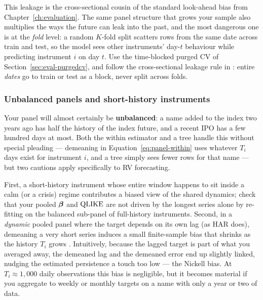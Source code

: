 \begin{projectconnection}
This leakage is the cross-sectional cousin of the standard look-ahead bias from
Chapter~\ref{ch:evaluation}.  The same panel structure that grows your sample
also multiplies the ways the future can leak into the past, and the most
dangerous one is at the \emph{fold} level: a random $K$-fold split scatters rows
from the same date across train and test, so the model sees other instruments'
day-$t$ behaviour while predicting instrument $i$ on day $t$.  Use the
time-blocked purged CV of Section~\ref{sec:eval-purgedcv}, and follow the
cross-sectional leakage rule in : entire
\emph{dates} go to train or test as a block, never split across folds.
\end{projectconnection}

\subsubsection*{Unbalanced panels and short-history instruments}

Your panel will almost certainly be \textbf{unbalanced}: a name added to the
index two years ago has half the history of the index future, and a recent IPO
has a few hundred days at most.  Both the within estimator and a tree handle this
without special pleading --- demeaning in Equation~\eqref{eq:panel-within} uses
whatever $T_i$ days exist for instrument $i$, and a tree simply sees fewer rows
for that name --- but two cautions apply specifically to RV forecasting.

\begin{warning}
First, a short-history instrument whose entire window happens to sit inside a
calm (or a crisis) regime contributes a biased view of the shared dynamics;
check that your pooled $\bm{\beta}$ and $\operatorname{QLIKE}$ are not driven by the longest series
alone by re-fitting on the balanced sub-panel of full-history instruments.
Second, in a \emph{dynamic} pooled panel where the target depends on its own lag
(as HAR does), demeaning a very short series induces a small finite-sample bias
that shrinks as the history $T_i$ grows \citep{Nickell1981}.  Intuitively, because
the lagged target is part of what you averaged away, the demeaned lag and the
demeaned error end up slightly linked, nudging the estimated persistence a touch
too low --- the Nickell bias.  At $T_i \approx 1{,}000$ daily
observations this bias is negligible, but it becomes material if you aggregate to
weekly or monthly targets on a name with only a year or two of data.
\end{warning}

